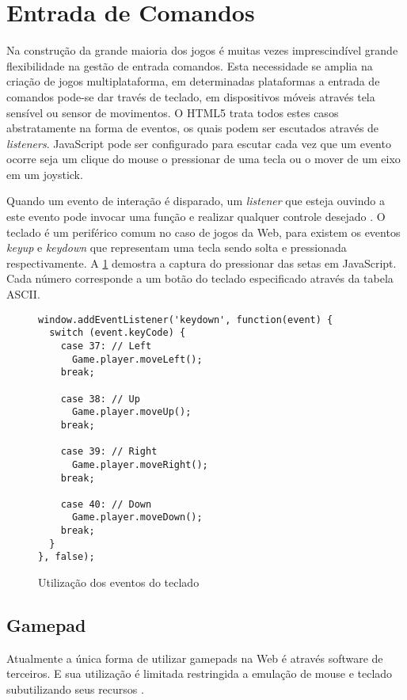 \section{Entrada de Comandos}
Na construção da grande maioria dos jogos é muitas vezes
imprescindível grande flexibilidade na gestão de entrada comandos.
Esta necessidade se amplia na criação de jogos multiplataforma, em
determinadas plataformas a entrada de comandos pode-se dar través de
teclado, em dispositivos móveis através tela sensível ou sensor de
movimentos. O HTML5 trata todos estes casos abstratamente na forma de
eventos, os quais podem ser escutados através de \textit{listeners}.
JavaScript pode ser configurado para escutar cada vez que um evento
ocorre seja um clique do mouse o pressionar de uma tecla ou o mover de
um eixo em um joystick.

Quando um evento de interação é disparado, um \textit{listener}
que esteja ouvindo a este evento pode invocar uma função e realizar
qualquer controle desejado \autocite{buildingHtml5Game}. O teclado é
um periférico comum no caso de jogos da Web, para existem os eventos
\textit{keyup} e \textit{keydown} que representam uma tecla sendo solta
e pressionada respectivamente. A \ref{fig:keyboardEvents} demostra a
captura do pressionar das setas em JavaScript. Cada número corresponde
a um botão do teclado especificado através da tabela ASCII.

\begin{figure}[H]
\centering
\begin{verbatim}
window.addEventListener('keydown', function(event) {
  switch (event.keyCode) {
    case 37: // Left
      Game.player.moveLeft();
    break;

    case 38: // Up
      Game.player.moveUp();
    break;

    case 39: // Right
      Game.player.moveRight();
    break;

    case 40: // Down
      Game.player.moveDown();
    break;
  }
}, false);
\end{verbatim}
\caption{Utilização dos eventos do teclado}
\label{fig:keyboardEvents}
\end{figure}

\subsection{Gamepad}

Atualmente a única forma de utilizar gamepads na Web é
através software de terceiros. E sua utilização é limitada
restringida a emulação de mouse e teclado subutilizando seus
recursos \autocite{gamepad}.

